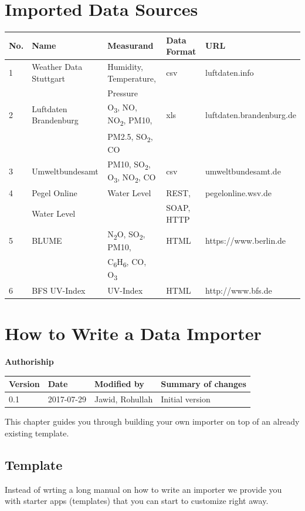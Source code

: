 \section{Imported Data Sources}

\begin{longtable}{lllll}
\toprule
 No. & Name  & Measurand & Data Format & URL \tabularnewline
\midrule
\endhead
 1 & Weather Data Stuttgart & Humidity, Temperature, & csv & luftdaten.info \tabularnewline
   & & Pressure & & \\ 
 2 & Luftdaten Brandenburg & O\textsubscript{3}, NO, NO\textsubscript{2}, PM10, & xls & luftdaten.brandenburg.de \tabularnewline
	 & & PM2.5, SO\textsubscript{2}, CO & & \tabularnewline
 3 & Umweltbundesamt & PM10, SO\textsubscript{2}, O\textsubscript{3}, NO\textsubscript{2}, CO & csv &  umweltbundesamt.de \tabularnewline
 4 & Pegel Online & Water Level & REST, & pegelonline.wsv.de \tabularnewline
   & Water Level & & SOAP, HTTP & \tabularnewline
 5 & BLUME & N\textsubscript{2}O, SO\textsubscript{2}, PM10, & HTML & https://www.berlin.de \tabularnewline
	 & & C\textsubscript{6}H\textsubscript{6}, CO, O\textsubscript{3} & & \tabularnewline
 6 & BFS UV-Index & UV-Index & HTML & http://www.bfs.de\tabularnewline
\bottomrule
\end{longtable}

\section{How to Write a Data
Importer}\label{how-to-write-a-data-importer}

\textbf{Authoriship}

\begin{longtable}[]{@{}llll@{}}
\toprule
Version & Date & Modified by & Summary of changes\tabularnewline
\midrule
\endhead
0.1 & 2017-07-29 & Jawid, Rohullah & Initial version\tabularnewline
\bottomrule
\end{longtable}

\vspace*{4mm}

This chapter guides you through building your own importer on top of an
already existing template.

\subsection{Template}\label{template}

Instead of wrting a long manual on how to write an importer we provide
you with starter apps (templates) that you can start to customize right
away.

